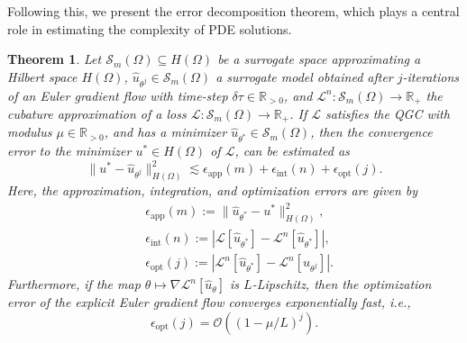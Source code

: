 \documentclass[pdflatex]{sn-jnl}%
\newtheorem{theorem}{Theorem}[section]%
\newtheorem{remark}[theorem]{Remark}
\newtheorem{definition}[theorem]{Definition}
\begin{document}
Following this, we present the error decomposition theorem, which plays a central role in estimating the complexity of PDE solutions.
\begin{theorem}\label{thm:erro_dec}
 Let $\mathcal{S}_m(\Omega)\subseteq H(\Omega)$ be a surrogate space approximating a Hilbert space $H(\Omega)$, $\hat{u}_{\theta^j}\in \mathcal{S}_m(\Omega)$ a surrogate model obtained after $j$-iterations of an Euler gradient flow with time-step $\delta \tau\in \mathbb{R}_{> 0}$, and $\mathcal{L}^n:\mathcal{S}_m(\Omega)\rightarrow\mathbb{R}_+$ the cubature approximation of a loss $\mathcal{L}:\mathcal{S}_m(\Omega)\rightarrow\mathbb{R}_+$. If $\mathcal{L}$ satisfies the QGC with modulus $\mu\in \mathbb{R}_{>0}$, and has a minimizer $\hat{u}_{\theta^*}\in \mathcal{S}_m(\Omega)$, then the convergence error to the minimizer $u^*\in H(\Omega)$ of $\mathcal{L}$, can be estimated as
    \begin{equation}\label{Eq:erro_dec}
        \|u^*-\hat{u}_{\theta^j}\|_{H(\Omega)}^2\lesssim \epsilon_\mathrm{app}(m) + \epsilon_\mathrm{int}(n) + \epsilon_\mathrm{opt}(j).
    \end{equation}
     Here, the approximation, integration, and optimization errors are given by
    \begin{equation}
        \begin{array}{cc}
           &\epsilon_\mathrm{app}(m):=\|\hat{u}_{\theta^*}-u^*\|_{H(\Omega)}^2,\\
           &\epsilon_\mathrm{int}(n):= |\mathcal{L}[\hat{u}_{\theta^*}]-\mathcal{L}^n[\hat{u}_{\theta^*}]|,\\&
           \epsilon_\mathrm{opt}(j):= |\mathcal{L}^n[\hat{u}_{\theta^*}]-\mathcal{L}^n[\hat{u}_{\theta^j}]|.
        \end{array}
    \end{equation}
    Furthermore, if the map $\theta\mapsto \nabla\mathcal{L}^n[\hat{u}_\theta]$ is $L$-Lipschitz, then the optimization error of the explicit Euler gradient flow converges exponentially fast, i.e.,
    \begin{equation}\label{eq:opt_exp}
        \epsilon_\mathrm{opt}(j)=\mathcal{O}\left((1-\mu/L)^{j}\right).
    \end{equation}
\end{theorem}
\end{document}
